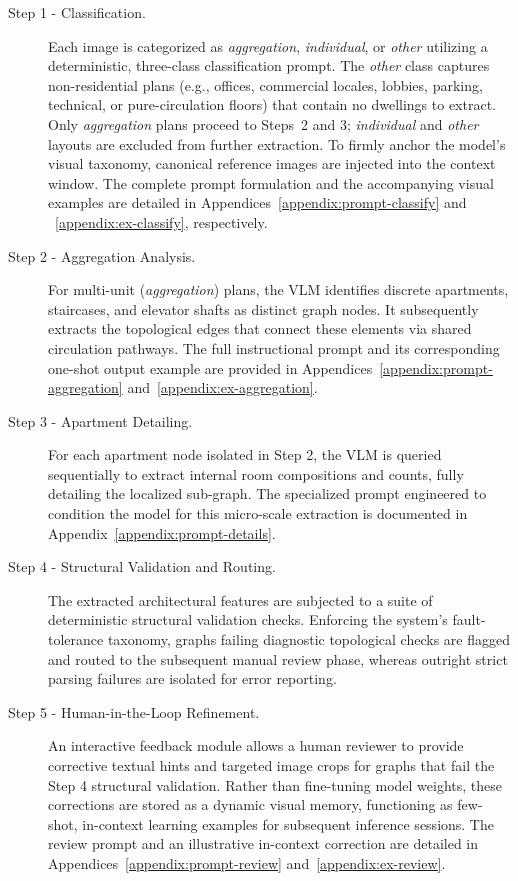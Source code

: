 \documentclass[12pt,a4paper,openright]{report}
\begin{document}
\begin{description}
    \item[Step 1 - Classification.] Each image is categorized as \textit{aggregation}, \textit{individual}, or \textit{other} utilizing a deterministic, three-class classification prompt. The \textit{other} class captures non-residential plans (e.g., offices, commercial locales, lobbies, parking, technical, or pure-circulation floors) that contain no dwellings to extract. Only \textit{aggregation} plans proceed to Steps~2 and 3; \textit{individual} and \textit{other} layouts are excluded from further extraction. To firmly anchor the model's visual taxonomy, canonical reference images are injected into the context window. The complete prompt formulation and the accompanying visual examples are detailed in Appendices~\ref{appendix:prompt-classify} and ~\ref{appendix:ex-classify}, respectively.
    
    \item[Step 2 - Aggregation Analysis.] For multi-unit (\textit{aggregation}) plans, the VLM identifies discrete apartments, staircases, and elevator shafts as distinct graph nodes. It subsequently extracts the topological edges that connect these elements via shared circulation pathways. The full instructional prompt and its corresponding one-shot output example are provided in Appendices~\ref{appendix:prompt-aggregation} and~\ref{appendix:ex-aggregation}.
    
    \item[Step 3 - Apartment Detailing.] For each apartment node isolated in Step 2, the VLM is queried sequentially to extract internal room compositions and counts, fully detailing the localized sub-graph. The specialized prompt engineered to condition the model for this micro-scale extraction is documented in Appendix~\ref{appendix:prompt-details}.
    
    \item[Step 4 - Structural Validation and Routing.] The extracted architectural features are subjected to a suite of deterministic structural validation checks. Enforcing the system's fault-tolerance taxonomy, graphs failing diagnostic topological checks are flagged and routed to the subsequent manual review phase, whereas outright strict parsing failures are isolated for error reporting.
    
    \item[Step 5 - Human-in-the-Loop Refinement.] An interactive feedback module allows a human reviewer to provide corrective textual hints and targeted image crops for graphs that fail the Step 4 structural validation. Rather than fine-tuning model weights, these corrections are stored as a dynamic visual memory, functioning as few-shot, in-context learning examples for subsequent inference sessions. The review prompt and an illustrative in-context correction are detailed in Appendices~\ref{appendix:prompt-review} and~\ref{appendix:ex-review}.
    

\end{description}
\end{document}
